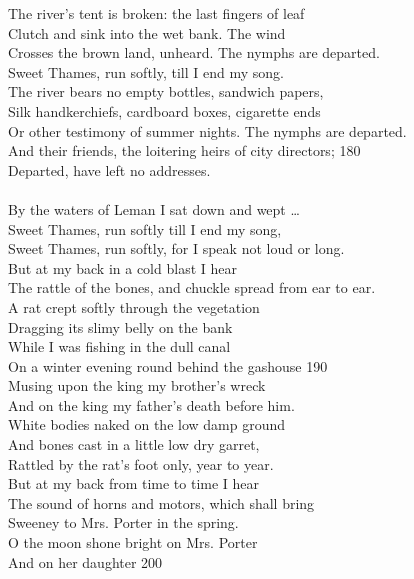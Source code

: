 \documentclass{article}
\begin{document}
The river's tent is broken: the last fingers of leaf \\
Clutch and sink into the wet bank. The wind \\
Crosses the brown land, unheard. The nymphs are departed. \\
Sweet Thames, run softly, till I end my song. \\
The river bears no empty bottles, sandwich papers, \\
Silk handkerchiefs, cardboard boxes, cigarette ends \\
Or other testimony of summer nights. The nymphs are departed. \\
And their friends, the loitering heirs of city directors;        \hfill 180 \\
Departed, have left no addresses. \\
 \\
By the waters of Leman I sat down and wept \ldots \\
Sweet Thames, run softly till I end my song, \\
Sweet Thames, run softly, for I speak not loud or long. \\
But at my back in a cold blast I hear \\
The rattle of the bones, and chuckle spread from ear to ear. \\
A rat crept softly through the vegetation \\
Dragging its slimy belly on the bank \\
While I was fishing in the dull canal \\
On a winter evening round behind the gashouse                    \hfill 190 \\
Musing upon the king my brother's wreck \\
And on the king my father's death before him. \\
White bodies naked on the low damp ground \\
And bones cast in a little low dry garret, \\
Rattled by the rat's foot only, year to year. \\
But at my back from time to time I hear \\
The sound of horns and motors, which shall bring \\
Sweeney to Mrs. Porter in the spring. \\
O the moon shone bright on Mrs. Porter \\
And on her daughter                                              \hfill  200 \\
\end{document}

